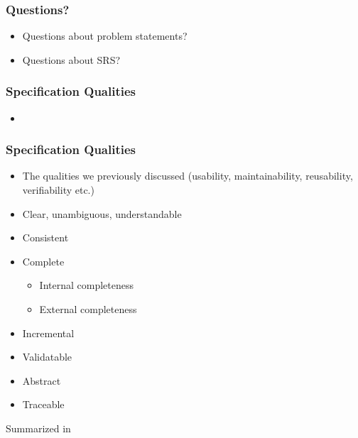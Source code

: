 \documentclass[t,12pt,numbers,fleqn]{beamer}
\begin{document}

\begin{frame}
\frametitle{Questions?}
\begin{itemize}
\item Questions about problem statements?
\item Questions about SRS?
\end{itemize}
\end{frame}


\begin{frame}
\frametitle{Specification Qualities}

\begin{itemize}

\item {}

\end{itemize}

\end{frame}


\begin{frame}
\frametitle{Specification Qualities}

\begin{itemize}
\item The qualities we previously discussed (usability, maintainability,
  reusability, verifiability etc.)
\item Clear, unambiguous,  understandable
\item Consistent
\item Complete
\begin{itemize}
\item Internal completeness
\item External completeness
\end{itemize}
\item Incremental
\item Validatable
\item Abstract
\item Traceable
\end{itemize}

Summarized in \cite[p.\ 406]{SmithAndKoothoor2016}

\end{frame}

\end{document}
